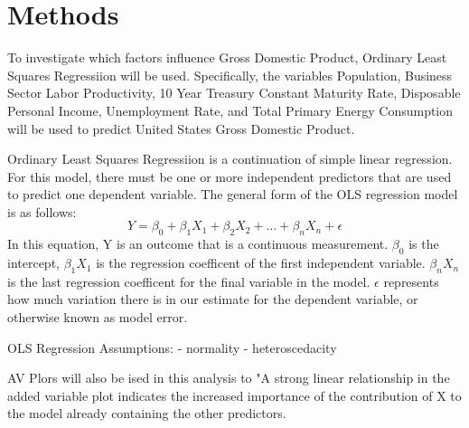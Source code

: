 \documentclass[12pt]{article}
\begin{document}
\section*{Methods}
To investigate which factors influence Gross Domestic Product, Ordinary Least Squares Regressiion will be used. 
Specifically, the variables Population, Business Sector Labor Productivity, 10 Year Treasury Constant Maturity Rate, Disposable Personal Income, Unemployment Rate, and Total Primary Energy Consumption will be used to predict United States Gross Domestic Product.

Ordinary Least Squares Regressiion is a continuation of simple linear regression. 
For this model, there must be one or more independent predictors that are used to predict one dependent variable. 
The general form of the OLS regression model is as follows: 
\begin{equation}
  Y = \beta_0 + \beta_1 X_1 + \beta_2 X_2 + ... + \beta_n X_n + \epsilon
\end{equation}
In this equation, Y is an outcome that is a continuous measurement. $\beta_0$ is the intercept, $\beta_1 X_1$ is the regression coefficent of the first independent variable. 
$\beta_n X_n$ is the last regression coefficent for the final variable in the model.
$\epsilon$ represents how much variation there is in our estimate for the dependent variable, or otherwise known as model error. 

OLS Regression Assumptions:
- normality
- heteroscedacity

AV Plors will also be ised in this analysis to 
"A strong linear relationship in the added variable plot indicates the increased importance of the contribution of X to the model already containing the other predictors.
\end{document}
